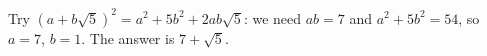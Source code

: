 Try $(a+b\sqrt5)^2=a^2+5b^2+2ab\sqrt5$: we need $ab=7$ and $a^2+5b^2=54$, so $a=7$, $b=1$. The answer is $\boxed{7+\sqrt5}$.
